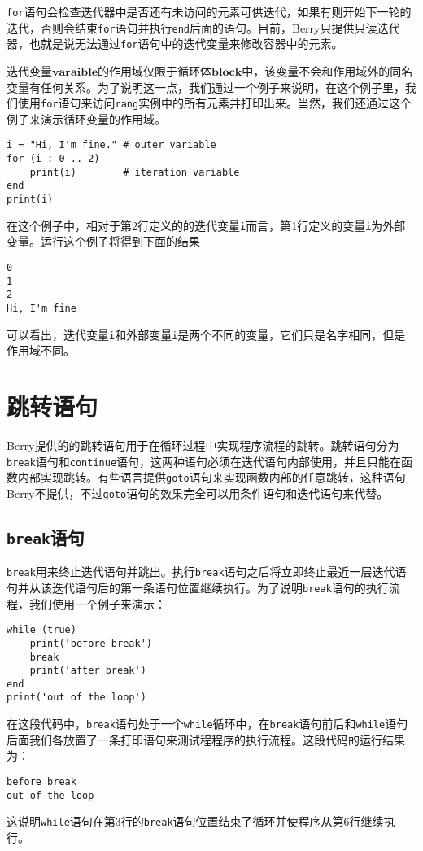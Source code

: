 \texttt{for}语句会检查迭代器中是否还有未访问的元素可供迭代，如果有则开始下一轮的迭代，否则会结束\texttt{for}语句并执行\texttt{end}后面的语句。目前，Berry只提供只读迭代器，也就是说无法通过\texttt{for}语句中的迭代变量来修改容器中的元素。

迭代变量$\bm{varaible}$的作用域仅限于循环体$\bm{block}$中，该变量不会和作用域外的同名变量有任何关系。为了说明这一点，我们通过一个例子来说明，在这个例子里，我们使用\texttt{for}语句来访问\texttt{rang}实例中的所有元素并打印出来。当然，我们还通过这个例子来演示循环变量的作用域。
\begin{lstlisting}[language=berry]
i = "Hi, I'm fine." # outer variable
for (i : 0 .. 2)
    print(i)        # iteration variable
end
print(i)
\end{lstlisting}

在这个例子中，相对于第2行定义的的迭代变量\texttt{i}而言，第1行定义的变量\texttt{i}为外部变量。运行这个例子将得到下面的结果
\begin{lstlisting}[numbers=none]
0
1
2
Hi, I'm fine
\end{lstlisting}
可以看出，迭代变量\texttt{i}和外部变量\texttt{i}是两个不同的变量，它们只是名字相同，但是作用域不同。

\section{跳转语句}

Berry提供的的跳转语句用于在循环过程中实现程序流程的跳转。跳转语句分为\texttt{break}语句和\texttt{continue}语句，这两种语句必须在迭代语句内部使用，并且只能在函数内部实现跳转。有些语言提供\texttt{goto}语句来实现函数内部的任意跳转，这种语句Berry不提供，不过\texttt{goto}语句的效果完全可以用条件语句和迭代语句来代替。

\subsection{\texttt{break}语句}

\texttt{break}用来终止迭代语句并跳出。执行\texttt{break}语句之后将立即终止最近一层迭代语句并从该迭代语句后的第一条语句位置继续执行。为了说明\texttt{break}语句的执行流程，我们使用一个例子来演示：
\begin{lstlisting}[language=berry]
while (true)
    print('before break')
    break
    print('after break')
end
print('out of the loop')
\end{lstlisting}
在这段代码中，\texttt{break}语句处于一个\texttt{while}循环中，在\texttt{break}语句前后和\texttt{while}语句后面我们各放置了一条打印语句来测试程程序的执行流程。这段代码的运行结果为：
\begin{lstlisting}[numbers=none]
before break
out of the loop
\end{lstlisting}
这说明\texttt{while}语句在第3行的\texttt{break}语句位置结束了循环并使程序从第6行继续执行。

